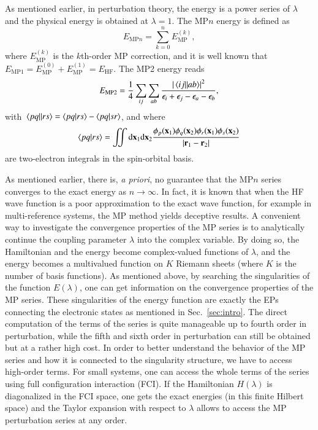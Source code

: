 \documentclass[aps,prb,reprint,noshowkeys,superscriptaddress]{revtex4-1}
\begin{document}
As mentioned earlier, in perturbation theory, the energy is a power series of $\lambda$ and the physical energy is obtained at $\lambda = 1$. 
The MP$n$ energy is defined as 
\begin{equation}
	E_{\text{MP}n}= \sum_{k=0}^n E_{\text{MP}}^{(k)},
\end{equation}
where $E_{\text{MP}}^{(k)}$ is the $k$th-order MP correction, and it is well known that $E_{\text{MP1}} =  E_{\text{MP}}^{(0)} + E_{\text{MP}}^{(1)} = E_\text{HF}$. \cite{SzaboBook}
The MP2 energy reads
\begin{equation}\label{eq:EMP2}
	E_{\text{MP2}} = \frac{1}{4} \sum_{ij} \sum_{ab} \frac{\abs{\mel{ij}{}{ab}}^2}{\epsilon_i + \epsilon_j - \epsilon_a - \epsilon_b},
\end{equation}
with $\mel{pq}{}{rs} = \braket{pq}{rs} - \braket{pq}{sr}$, and where  
\begin{equation}
	\braket{pq}{rs} = \iint \dd\vb{x}_1\dd\vb{x}_2\frac{\phi_p(\vb{x}_1)\phi_q(\vb{x}_2)\phi_r(\vb{x}_1)\phi_s(\vb{x}_2)}{\abs{\vb{r}_1 - \vb{r}_2}}
\end{equation}
are two-electron integrals in the spin-orbital basis. \cite{Gill_1994}

As mentioned earlier, there is, \textit{a priori}, no guarantee that the MP$n$ series converges to the exact energy as $n \to \infty$. 
In fact, it is known that when the HF wave function is a poor approximation to the exact wave function, for example in multi-reference systems, the MP method yields deceptive results. \cite{Gill_1986,Gill_1988,Handy_1985,Lepetit_1988,Leininger_2000}
A convenient way to investigate the convergence properties of the MP series is to analytically continue the coupling parameter $\lambda$ into the complex variable. 
By doing so, the Hamiltonian and the energy become complex-valued functions of $\lambda$, and the energy becomes a multivalued function on $K$ Riemann sheets (where $K$ is the number of basis functions).
As mentioned above, by searching the singularities of the function $E(\lambda)$, one can get information on the convergence properties of the MP series. 
These singularities of the energy function are exactly the EPs connecting the electronic states as mentioned in Sec.~\ref{sec:intro}. 
The direct computation of the terms of the series is quite manageable up to fourth order in perturbation, while the fifth and sixth order in perturbation can still be obtained but at a rather high cost. \cite{JensenBook}
In order to better understand the behavior of the MP series and how it is connected to the singularity structure, we have to access high-order terms. 
For small systems, one can access the whole terms of the series using full configuration interaction (FCI). 
If the Hamiltonian $H(\lambda)$ is diagonalized in the FCI space, one gets the exact energies (in this finite Hilbert space) and the Taylor expansion with respect to $\lambda$ allows to access the MP perturbation series at any order.
\end{document}
